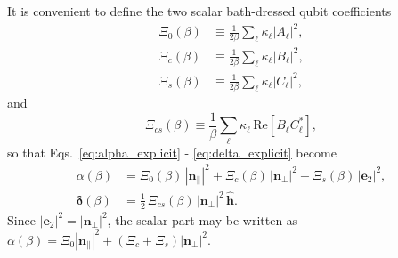 It is convenient to define the two scalar bath-dressed qubit coefficients
\begin{align}
    \Xi_0(\beta)&\equiv \frac{1}{2\beta}\sum_{\ell}\kappa_\ell |A_\ell|^2, \nonumber\\
    \Xi_c(\beta)&\equiv \frac{1}{2\beta}\sum_{\ell}\kappa_\ell |B_\ell|^2, \nonumber\\
    \Xi_s(\beta)&\equiv \frac{1}{2\beta}\sum_{\ell}\kappa_\ell |C_\ell|^2,
\end{align}
and
\begin{equation}
    \Xi_{cs}(\beta)\equiv \frac{1}{\beta}\sum_{\ell}\kappa_\ell\,\mathrm{Re}[B_\ell C_\ell^*],
\end{equation}
so that Eqs.~\eqref{eq:alpha_explicit} - \eqref{eq:delta_explicit} become
\begin{align}
    \alpha(\beta)
    &= \Xi_0(\beta)\,|\mathbf n_\parallel|^2
       + \Xi_c(\beta)\,|\mathbf n_\perp|^2
       + \Xi_s(\beta)\,|\mathbf e_2|^2,
       \label{eq:alpha_compact}\\
    \boldsymbol\delta(\beta)
    &= \frac{1}{2}\,\Xi_{cs}(\beta)\,|\mathbf n_\perp|^2\,\hat{\mathbf h}.
       \label{eq:delta_compact}
\end{align}
Since $|\mathbf e_2|^2=|\mathbf n_\perp|^2$, the scalar part may be written as
$\alpha(\beta)=\Xi_0|\mathbf n_\parallel|^2+(\Xi_c+\Xi_s)|\mathbf n_\perp|^2$.


